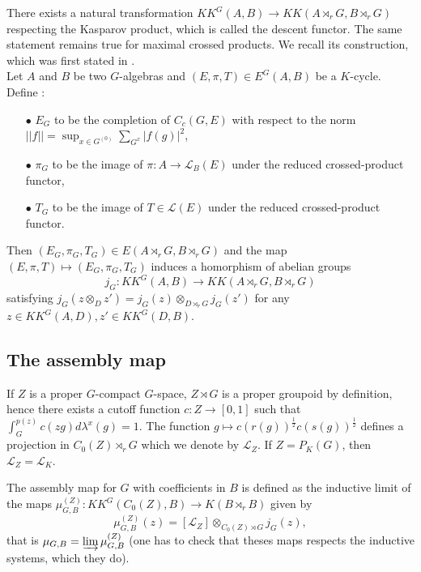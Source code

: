 There exists a natural transformation $KK^G(A,B)\rightarrow KK(A\rtimes_r G, B\rtimes_r G)$ respecting the Kasparov product, which is called the descent functor. The same statement remains true for maximal crossed products. We recall its construction, which was first stated in \cite{LeGall}.\\
 
Let $A$ and $B$ be two $G$-algebras and $(E,\pi,T)\in E^G(A,B)$ be a $K$-cycle. Define :
\begin{itemize}
\item[$\bullet$] $E_G$ to be the completion of $C_c(G,E)$ with respect to the norm $||f||= \sup_{x\in G^{(0)}} \sum_{G^x} |f(g)|^2$,
\item[$\bullet$] $\pi_G$ to be the image of $\pi:A \rightarrow \mathcal L_B(E)$ under the reduced crossed-product functor,
\item[$\bullet$] $T_G$ to be the image of $T\in\mathcal L(E)$ under the reduced crossed-product functor.
\end{itemize}
Then $(E_G,\pi_G,T_G)\in E(A\rtimes_r G,B\rtimes_r G)$ and the map $(E,\pi,T)\mapsto (E_G,\pi_G,T_G) $ induces a homorphism of abelian groups
\[j_G : KK^G(A,B)\rightarrow KK(A\rtimes_r G,B\rtimes_r G)\]
satisfying $j_G(z\otimes_D z')=j_G(z)\otimes_{D\rtimes_r G} j_G(z')$ for any $z\in KK^G(A,D), z'\in KK^G(D,B)$.\\ 

\subsection{The assembly map}

If $Z$ is a proper $G$-compact $G$-space, $Z\rtimes G$ is a proper groupoid by definition, hence there exists a cutoff function $c : Z\rightarrow [0,1]$ such that $\int_G^{p(z)} c(zg)d\lambda^x(g) = 1$. The function $g\mapsto c(r(g))^{\frac{1}{2}}c(s(g))^{\frac{1}{2}} $ defines a projection in $C_0(Z)\rtimes_r G$ which we denote by $\mathcal L_Z$. If $Z=P_K(G)$, then $\mathcal L_Z = \mathcal L_K$.

\begin{definition}
The assembly map for $G$ with coefficients in $B$ is defined as the inductive limit of the maps $\mu_{G,B}^{(Z)} : KK^G(C_0(Z),B)\rightarrow K(B\rtimes_r B)$ given by
\[\mu_{G,B}^{(Z)} (z)=[\mathcal L_Z]\otimes_{C_0(Z)\rtimes G} j_G(z),\]
that is $\mu_{G,B} = \varinjlim \mu_{G,B}^{(Z)}$ (one has to check that theses maps respects the inductive systems, which they do).
\end{definition}

